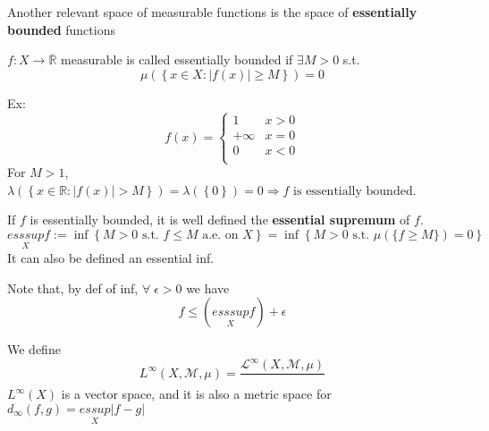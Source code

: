 Another relevant space of measurable functions is the space of \textbf{essentially bounded} functions
\begin{definition}
    \(f : X \to \overline{\mathbb{R}}\) measurable is called essentially bounded if \(\exists M > 0\) s.t.
    \[
        \mu(\left\lbrace x \in X : \vert f(x) \vert \geq M \right\rbrace) = 0
    \]
\end{definition}
Ex: 
\[f(x) = \begin{cases}
    1 & x > 0 \\
+\infty & x = 0 \\
0 & x < 0 \\
\end{cases}
\] 
For \(M > 1\), \(\lambda(\left\lbrace x \in \mathbb{R} : \vert f(x) \vert > M\right\rbrace) = \lambda(\left\lbrace 0 \right\rbrace) = 0 \Longrightarrow f\mbox{ is essentially bounded}\).


If \(f\) is essentially bounded, it is well defined the \textbf{essential supremum} of \(f\).
\[
    \underset{X}{esssup} f := \inf \left\lbrace M > 0 \mbox{ s.t. } f \leq M \mbox{ a.e. on }X\right\rbrace = \inf \left\lbrace M > 0 \mbox{ s.t. } \mu(\{f \geq M \})=0 \right\rbrace
\]
It can also be defined an essential inf.
\begin{remark}
    Note that, by def of inf, \(\forall \; \epsilon > 0\) we have 
    \[
        f \leq (\underset{X}{esssup} f) + \epsilon
    \]
\end{remark}
We define 
\[
    L^{\infty} (X, \mathcal{M}, \mu) = \frac{\mathcal{L}^{\infty}(X, \mathcal{M}, \mu)}{~}
\]
\(L^{\infty}(X)\) is a vector space, and it is also a metric space for \(d_{\infty}(f,g) = \underset{X}{essup} \vert f-g \vert\)
